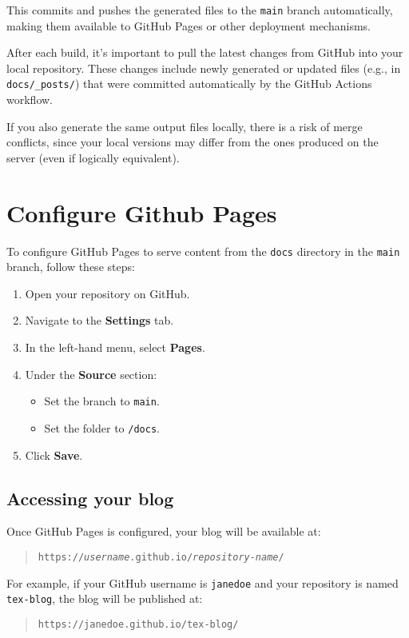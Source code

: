 \documentclass{article}
\begin{document}
This commits and pushes the generated files to the \texttt{main} branch automatically, 
making them available to GitHub Pages or other deployment mechanisms.

After each build, it's important to pull the latest changes from GitHub into
your local repository. These changes include newly generated or updated files
(e.g., in \verb|docs/_posts/|) that were committed automatically by the GitHub Actions
workflow.

If you also generate the same output files locally, there is a risk of merge
conflicts, since your local versions may differ from the ones produced on the
server (even if logically equivalent).

\section{Configure Github Pages}

To configure GitHub Pages to serve content from the \texttt{docs} directory in the \texttt{main} branch, follow these steps:

\begin{enumerate}
  \item Open your repository on GitHub.
  \item Navigate to the \textbf{Settings} tab.
  \item In the left-hand menu, select \textbf{Pages}.
  \item Under the \textbf{Source} section:
    \begin{itemize}
      \item Set the branch to \texttt{main}.
      \item Set the folder to \texttt{/docs}.
    \end{itemize}
  \item Click \textbf{Save}.
\end{enumerate}


\subsection*{Accessing your blog}

Once GitHub Pages is configured, your blog will be available at:

\begin{quote}
\texttt{https://\textit{username}.github.io/\textit{repository-name}/}
\end{quote}

For example, if your GitHub username is \texttt{janedoe} and your repository is named \texttt{tex-blog}, the blog will be published at:

\begin{quote}
\texttt{https://janedoe.github.io/tex-blog/}
\end{quote}
\end{document}
